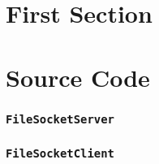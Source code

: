 



\MYTITLE{}
\MYHEADERS{}
\PLEDGE{}

\section{First Section}
\label{sec:section}

\newpage
\section{Source Code}
\label{sec:source}

\subsubsection{\texttt{FileSocketServer}}


\subsubsection{\texttt{FileSocketClient}}



